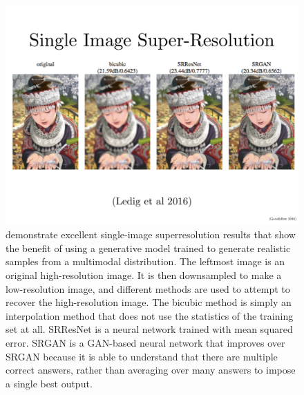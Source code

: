 \begin{figure}
  \centering
  \includegraphics[width=\textwidth]{superres}
  \caption{
\citet{Ledig16} demonstrate excellent single-image superresolution results that show
the benefit of using a generative model trained to generate realistic samples from
 a multimodal distribution.
 The leftmost image is an original high-resolution image.
 It is then downsampled to make a low-resolution image, and different methods
 are used to attempt to recover the high-resolution image.
 The bicubic method is simply an interpolation method that does not use 
 the statistics of the training set at all.
 SRResNet is a neural network trained with mean squared error.
 SRGAN is a GAN-based neural network that improves over SRGAN because it is able
 to understand that there are multiple correct answers, rather than averaging
 over many answers to impose a single best output.
  }
  \label{fig:superres}
\end{figure}


